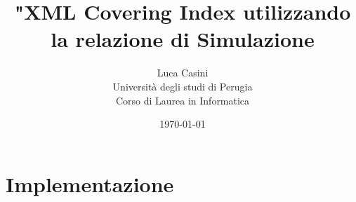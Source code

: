 \documentclass[12pt,a4paper,openright,twoside]{report}
\theoremstyle{definition}
\begin{document}
\begin{titlepage}
\title{"XML Covering Index utilizzando la relazione di Simulazione}
\date{\today}
\author{Luca Casini\\Università degli studi di Perugia\\Corso di Laurea in Informatica}
\end{titlepage}
\maketitle
\tableofcontents














\chapter{Implementazione}
\end{document}

